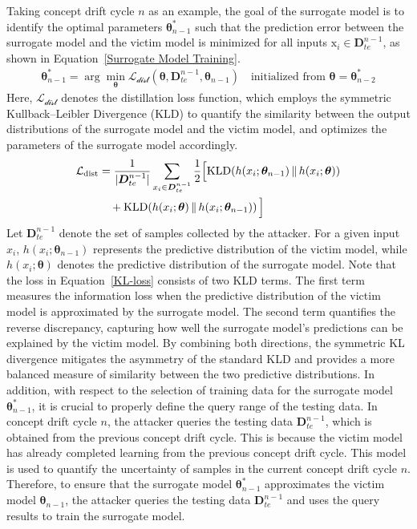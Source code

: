 \documentclass[lettersize,journal]{IEEEtran}
\begin{document}
Taking concept drift cycle $n$ as an example, the goal of the surrogate model is to identify the optimal parameters $\bm{\theta}_{n-1}^{*}$ such that the prediction error between the surrogate model and the victim model is minimized for all inputs $\bm{\mathrm{x}}_{i} \in \bm{D}_{te}^{n-1}$, as shown in Equation~\ref{Surrogate Model Training}.
\begin{equation}
	\begin{aligned}
		\bm{\theta}_{n-1}^{*} = \arg\min_{\bm{\theta}} \mathcal{L_{\text{dist}}} \left( \bm{\theta}, \bm{D}_{te}^{n-1} , \bm{\theta}_{n-1} \right)
		\quad \text{initialized from } \bm{\theta} = \bm{\theta}^{*}_{n-2}
	\end{aligned}
	\label{Surrogate Model Training}
\end{equation}
Here, $\mathcal{L_{\text{dist}}}$ denotes the distillation loss function, which employs the symmetric Kullback–Leibler Divergence (KLD) to quantify the similarity between the output distributions of the surrogate model and the victim model, and optimizes the parameters of the surrogate model accordingly.
\begin{equation}
	\small
	\begin{aligned}
		\mathcal{L_{\text{dist}}} 
		&= \frac{1}{|\bm{D}_{te}^{n-1}|} \sum_{x_i \in \bm{D}_{te}^{n-1}} \frac{1}{2} \Big[ 
		\mathrm{KLD}\!\left(h(x_i; \bm{\theta}_{n-1})\,\|\,h(x_i; \bm{\theta} )\right) \\
		&\quad + \mathrm{KLD}\!\left(h(x_i; \bm{\theta})\,\|\,h(x_i; \bm{\theta}_{n-1})\right) \Big]
	\end{aligned}
	\label{KL-loss}
\end{equation}
Let $\bm{D}_{te}^{n-1}$ denote the set of samples collected by the attacker.
For a given input $x_i$, $h(x_i; \bm{\theta}_{n-1})$ represents the predictive distribution of the victim model, while $h(x_i; \bm{\theta})$ denotes the predictive distribution of the surrogate model.
Note that the loss in Equation~\ref{KL-loss} consists of two KLD terms. 
The first term measures the information loss when the predictive distribution of the victim model is approximated by the surrogate model. 
The second term quantifies the reverse discrepancy, capturing how well the surrogate model’s predictions can be explained by the victim model. 
By combining both directions, the symmetric KL divergence mitigates the asymmetry of the standard KLD and provides a more balanced measure of similarity between the two predictive distributions.
In addition, with respect to the selection of training data for the surrogate model $\bm{\theta}_{n-1}^{*}$, it is crucial to properly define the query range of the testing data.
In concept drift cycle $n$, the attacker queries the testing data $\bm{D}_{te}^{n-1}$, which is obtained from the previous concept drift cycle.
This is because the victim model has already completed learning from the previous concept drift cycle.
This model is used to quantify the uncertainty of samples in the current concept drift cycle $n$.
Therefore, to ensure that the surrogate model $\bm{\theta}_{n-1}^{*}$ approximates the victim model $\bm{\theta}_{n-1}$, the attacker queries the testing data $\bm{D}_{te}^{n-1}$ and uses the query results to train the surrogate model.
\end{document}
